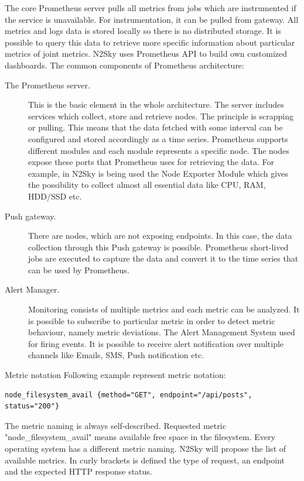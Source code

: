 The core Prometheus server pulls all metrics from jobs which are instrumented if the service is unavailable. For instrumentation, it can be pulled from gateway. All metrics and logs data is stored locally so there is no distributed storage. It is possible to query this data to retrieve more specific information about particular metrics of joint metrics. N2Sky uses Prometheus API to build own customized dashboards. 
The common components of Prometheus architecture:
\begin{description}
\item[The Prometheus server.] This is the basic element in the whole architecture. The server includes services which collect, store and retrieve nodes. The principle is scrapping or pulling. This means that the data fetched with some interval can be configured and stored accordingly as a time series. Prometheus supports different modules and each module represents a specific node. The nodes expose these ports that Prometheus uses for retrieving the data. For example, in N2Sky is being used the Node Exporter Module which gives the possibility to collect almost all essential data like CPU, RAM, HDD/SSD etc.
\item[Push gateway.] There are nodes, which are not exposing endpoints. In this case, the data collection through this Push gateway is possible. Prometheus short-lived jobs are executed to capture the data and convert it to the time series that can be used by Prometheus.
\item [Alert Manager.] Monitoring consists of multiple metrics and each metric can be analyzed. It is possible to subscribe to particular metric in order to detect metric behaviour, namely metric deviations. The Alert Management System used for firing events. It is possible to receive alert notification over multiple channels like Emails, SMS, Push notification etc.
\end{description}

Metric notation 
Following example represent metric notation:
\begin{lstlisting}
node_filesystem_avail {method="GET", endpoint="/api/posts", status="200"}
\end{lstlisting}

The metric naming is always self-described.  Requested metric "node\_filesystem\_avail" means available free space in the filesystem. Every operating system has a different metric naming. N2Sky will propose the list of available metrics. In curly brackets is defined the type of request, an endpoint and the expected HTTP response status.

